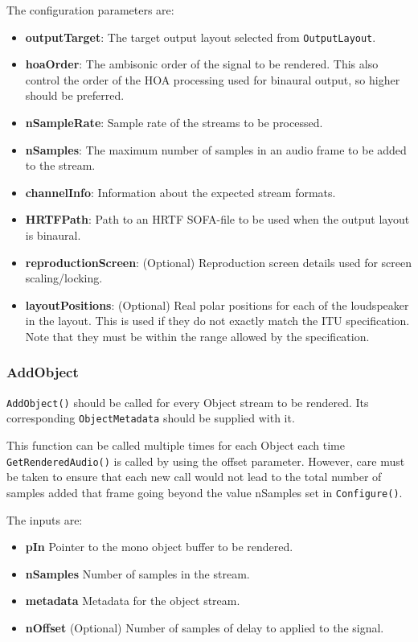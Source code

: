 \documentclass[12pt]{report}
\newcommand{\code}[1]{\texttt{#1}}
\begin{document}
The configuration parameters are:
\begin{itemize}
    \item \textbf{outputTarget}: The target output layout selected from \code{OutputLayout}.
    \item \textbf{hoaOrder}: The ambisonic order of the signal to be rendered. This also control the order of the HOA processing used for binaural output, so higher should be preferred.
    \item \textbf{nSampleRate}: Sample rate of the streams to be processed.
    \item \textbf{nSamples}: The maximum number of samples in an audio frame to be added to the stream.
    \item \textbf{channelInfo}: Information about the expected stream formats.
    \item \textbf{HRTFPath}: Path to an HRTF SOFA-file to be used when the output layout is binaural.
    \item \textbf{reproductionScreen}: (Optional) Reproduction screen details used for screen scaling/locking.
    \item \textbf{layoutPositions}: (Optional) Real polar positions for each of the loudspeaker in the layout. This is used if they do not exactly match the ITU specification. Note that they must be within the range allowed by the specification.
\end{itemize}

\subsubsection{AddObject}

\code{AddObject()} should be called for every Object stream to be rendered. Its corresponding \code{ObjectMetadata} should be supplied with it.

This function can be called multiple times for each Object each time \code{GetRenderedAudio()} is called by using the offset parameter.
However, care must be taken to ensure that each new call would not lead to the total number of samples added that frame going beyond the value nSamples set in \code{Configure()}.

The inputs are:
\begin{itemize}
    \item \textbf{pIn} Pointer to the mono object buffer to be rendered.
    \item \textbf{nSamples} Number of samples in the stream.
    \item \textbf{metadata} Metadata for the object stream.
    \item \textbf{nOffset} (Optional) Number of samples of delay to applied to the signal.
\end{itemize}
\end{document}
